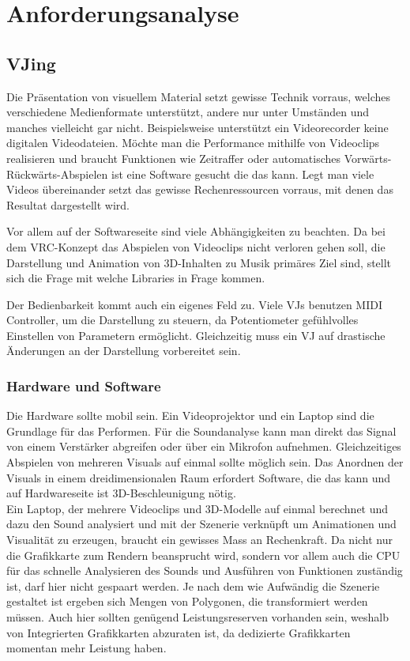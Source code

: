 \section{Anforderungsanalyse}


\subsection{VJing}

Die Pr\"asentation von visuellem Material setzt gewisse Technik vorraus, welches verschiedene Medienformate unterst\"utzt,
andere nur unter Umst\"anden und manches vielleicht gar nicht. Beispielsweise unterst\"utzt ein Videorecorder keine digitalen
Videodateien. M\"ochte man die Performance mithilfe von Videoclips realisieren und braucht Funktionen wie Zeitraffer oder
automatisches Vorw\"arts-R\"uckw\"arts-Abspielen ist eine Software gesucht die das kann. Legt man viele Videos \"ubereinander
setzt das gewisse Rechenressourcen vorraus, mit denen das Resultat dargestellt wird.

Vor allem auf der Softwareseite sind viele Abh\"angigkeiten zu beachten. Da bei dem VRC-Konzept das Abspielen von Videoclips
nicht verloren gehen soll, die Darstellung und Animation von 3D-Inhalten zu Musik prim\"ares Ziel sind, stellt sich die Frage
mit welche Libraries in Frage kommen.

Der Bedienbarkeit kommt auch ein eigenes Feld zu. Viele VJs benutzen MIDI Controller, um die Darstellung zu steuern, da
Potentiometer gef\"uhlvolles Einstellen von Parametern erm\"oglicht. Gleichzeitig muss ein VJ auf drastische \"Anderungen
an der Darstellung vorbereitet sein.

\subsubsection{Hardware und Software}

Die Hardware sollte mobil sein. Ein Videoprojektor und ein Laptop sind die Grundlage f\"ur das Performen. F\"ur die
Soundanalyse kann man direkt das Signal von einem Verst\"arker abgreifen oder \"uber ein Mikrofon aufnehmen. Gleichzeitiges
Abspielen von mehreren Visuals auf einmal sollte m\"oglich sein. Das Anordnen der Visuals in einem dreidimensionalen
Raum erfordert Software, die das kann und auf Hardwareseite ist 3D-Beschleunigung n\"otig.
\\
Ein Laptop, der mehrere Videoclips und 3D-Modelle auf einmal berechnet und dazu den Sound analysiert und mit der Szenerie
verkn\"upft um Animationen und Visualit\"at zu erzeugen, braucht ein gewisses Mass an Rechenkraft. Da nicht nur die
Grafikkarte zum Rendern beansprucht wird, sondern vor allem auch die CPU f\"ur das schnelle Analysieren des Sounds und
Ausf\"uhren von Funktionen zust\"andig ist, darf hier nicht gespaart werden. Je nach dem wie Aufw\"andig die Szenerie
gestaltet ist ergeben sich Mengen von Polygonen, die transformiert werden m\"ussen. Auch hier sollten gen\"ugend
Leistungsreserven vorhanden sein, weshalb von Integrierten Grafikkarten abzuraten ist, da dedizierte Grafikkarten
momentan mehr Leistung haben.

